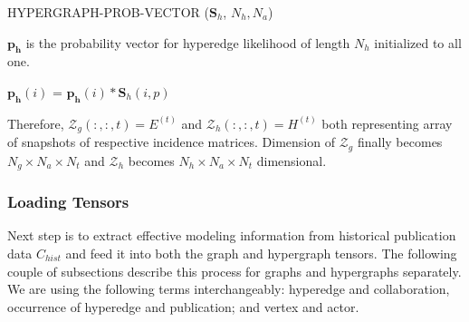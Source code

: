\documentclass[twoside,leqno,twocolumn]{article}
\begin{document}
\begin{algorithm} %
\caption{HYPERGRAPH-PROB-VECTOR ($\mathbf{S}_h$, $N_h, N_a$) } %
\label{alg2} %
\begin{algorithmic}[1] %

\STATE $\mathbf{p_h}$ is the probability vector for hyperedge likelihood of length $N_h$ initialized to all one.

\STATE $\mathbf{p_h}(i)$ = $\mathbf{p_h}(i) \ast \mathbf{S}_h (i,p)$ 
\ENDFOR 
\ENDFOR 


\end{algorithmic}
\end{algorithm}

Therefore, $\mathscr{Z}_{g}(:,:,t)=E^{(t)}$ and $\mathscr{Z}_{h}(:,:,t)=H^{(t)}$ both representing array of snapshots of respective incidence matrices. Dimension of $\mathscr{Z}_{g}$ finally becomes \(N_{g}\times N_{a}\times N_{t}\) and $\mathscr{Z}_{h}$ becomes \(N_{h}\times N_{a}\times N_{t}\) dimensional.

\subsubsection{Loading Tensors}

Next step is to extract effective modeling information from historical publication data $C_{hist}$ and feed it into both the graph and hypergraph tensors. The following couple of subsections describe this process for graphs and hypergraphs separately. We are using the following terms interchangeably: hyperedge and collaboration, occurrence of hyperedge and publication; and vertex and actor.
\end{document}
